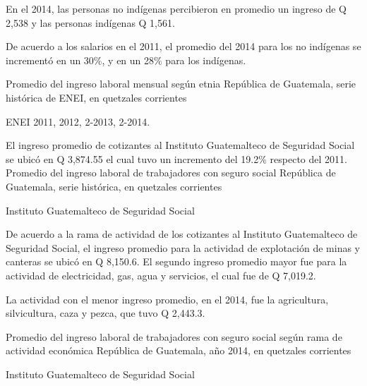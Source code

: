%
{%
En el 2014, las personas no indígenas percibieron en promedio un ingreso de Q 2,538 y las personas indígenas Q 1,561.

De acuerdo a los salarios en el 2011, el promedio del 2014 para los no indígenas se incrementó en un 30\%, y en un 28\% para los indígenas.}%
{%
	Promedio del ingreso laboral mensual según etnia} %
{%
	República de Guatemala, serie histórica de ENEI, en quetzales corrientes} %
{%
	\begin{tikzpicture}[x=1pt,y=1pt]    \end{tikzpicture}}%
{%
	ENEI 2011, 2012, 2-2013, 2-2014.} %



%
{%
El ingreso promedio de cotizantes al Instituto Guatemalteco de Seguridad Social se ubicó en Q 3,874.55 el cual tuvo un incremento del 19.2\% respecto del 2011.}%
{%
	Promedio del ingreso laboral de trabajadores con seguro social } %
{%
	República de Guatemala, serie histórica, en quetzales corrientes} %
{%
	\begin{tikzpicture}[x=1pt,y=1pt]    \end{tikzpicture}}%
{%
	Instituto Guatemalteco de Seguridad Social} %



%
{%
De acuerdo a la rama de actividad de los cotizantes al Instituto Guatemalteco de Seguridad Social, el ingreso promedio para la actividad de explotación de minas y canteras se ubicó en Q 8,150.6. El segundo ingreso promedio mayor fue para la actividad de electricidad, gas, agua y servicios, el cual fue de Q 7,019.2.

La actividad con el menor ingreso promedio, en el 2014, fue la agricultura, silvicultura, caza y pezca, que tuvo Q 2,443.3.}%
{%
	Promedio del ingreso laboral de trabajadores con seguro social según rama de actividad económica} %
{%
	República de Guatemala, año 2014, en quetzales corrientes} %
{%
	\begin{tikzpicture}[x=1pt,y=1pt]    \end{tikzpicture}}%
{%
	Instituto Guatemalteco de Seguridad Social} %

  
